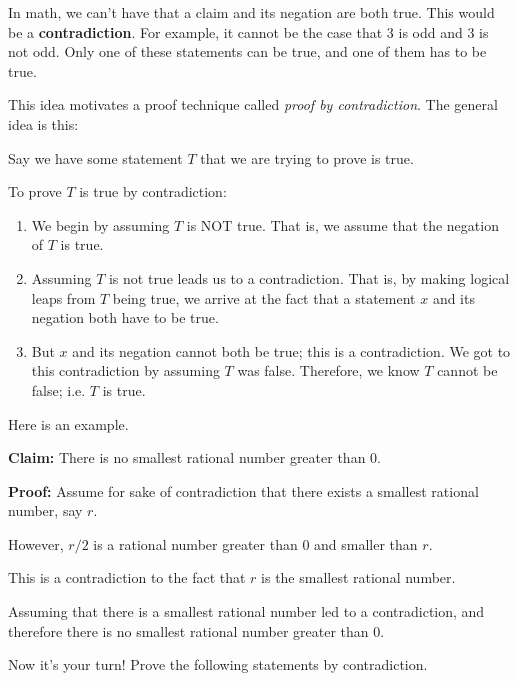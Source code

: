 \documentclass[12pt,letterpaper]{article}
\begin{document}
      In math, we can't have that a claim and its negation are both true. This would be a \textbf{contradiction}. For example, it cannot be the case that $3$ is odd and $3$ is not odd. Only one of these statements can be true, and one of them has to be true.

      This idea motivates a proof technique called \textit{proof by contradiction}. The general idea is this:

      Say we have some statement $T$ that we are trying to prove is true.

      To prove $T$ is true by contradiction: 
      \begin{enumerate}
        \item We begin by assuming $T$ is NOT true. That is, we assume that the negation of $T$ is true. 
        \item Assuming $T$ is not true leads us to a contradiction. That is, by making logical leaps from $T$ being true, we arrive at the fact that a statement $x$ and its negation both have to be true.
        \item But $x$ and its negation cannot both be true; this is a contradiction. We got to this contradiction by assuming $T$ was false. Therefore, we know $T$ cannot be false; i.e. $T$ is true.
      \end{enumerate}

      Here is an example.

      \textbf{Claim:}  There is no smallest rational number greater than 0.

      \textbf{Proof:} Assume for sake of contradiction that there exists a smallest rational number, say $r$.
      
      However, $r/2$ is a rational number greater than $0$ and smaller than $r$.
      
      This is a contradiction to the fact that $r$ is the smallest rational number.
      
      Assuming that there is a smallest rational number led to a contradiction, and therefore there is no smallest rational number greater than $0$.
      
      Now it's your turn! Prove the following statements by contradiction. 
      
\end{document}
